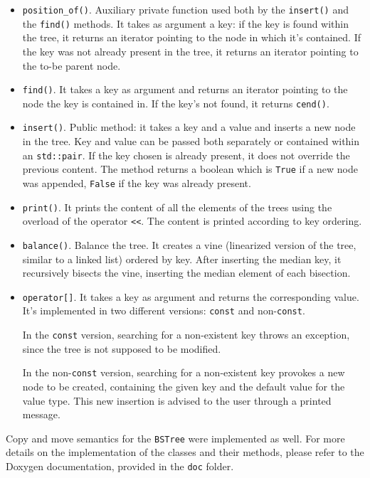 \documentclass[12pt,a4paper,openany]{scrartcl}
\begin{document}
\begin{itemize}
    \item \texttt{position\_of()}. Auxiliary private function used both by the \texttt{insert()} and the \texttt{find()} methods. It takes as argument a key: if the key is found within the tree, it returns an iterator pointing to the node in which it's contained. If the key was not already present in the tree, it returns an iterator pointing to the to-be parent node.
    \item \texttt{find()}. It takes a key as argument and returns an iterator pointing to the node the key is contained in. If the key's not found, it returns \texttt{cend()}.
    \item \texttt{insert()}. Public method: it takes a key and a value and inserts a new node in the tree. Key and value can be passed both separately or contained within an \texttt{std::pair}. If the key chosen is already present, it does not override the previous content. The method returns a boolean which is \texttt{True} if a new node was appended, \texttt{False} if the key was already present.
    \item \texttt{print()}. It prints the content of all the elements of the trees using the overload of the operator \texttt{<<}. The content is printed according to key ordering.
    \item \texttt{balance()}. Balance the tree. It creates a vine (linearized version of the tree, similar to a linked list) ordered by key. After inserting the median key, it recursively bisects the vine, inserting the median element of each bisection.
    \item \texttt{operator[]}. It takes a key as argument and returns the corresponding value. It's implemented in two different versions: \texttt{const} and non-\texttt{const}.
    
    In the \texttt{const} version, searching for a non-existent key throws an exception, since the tree is not supposed to be modified.
    
    In the non-\texttt{const} version, searching for a non-existent key provokes a new node to be created, containing the given key and the default value for the value type. This new insertion is advised to the user through a printed message.
\end{itemize}


	\noindent Copy and move semantics for the \texttt{BSTree} were implemented as well. For more details on the implementation of the classes and their methods, please refer to the Doxygen documentation, provided in the \texttt{doc} folder.
	
\end{document}
